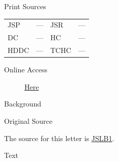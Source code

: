 			\begin{description}
				\item[Print Sources]
			\end{description}

				\begin{tabular}{p{0.5in}p{1in}p{0.5in}p{1in}}
				JSP	 	& --- 		& JSR 		& ---	 \\  
				DC	 	& --- 	& HC 		& ---	 \\
				HDDC 	& --- 		& TCHC 		& ---	 \\
				\end{tabular}
			
			\begin{description}
				\item[Online Access] \href{https://www.josephsmithpapers.org/paper-summary/letterbook-1/17}{Here}
			\end{description}
			
			\begin{description}
				\item[Background]
			\end{description}
			
			
			\begin{description}
				\item[Original Source]
			\end{description}
			
				
				The source for this letter is \hyperref[JSLB1]{JSLB1}.
			
			\begin{description}
				\item[Text]
			\end{description}
				
